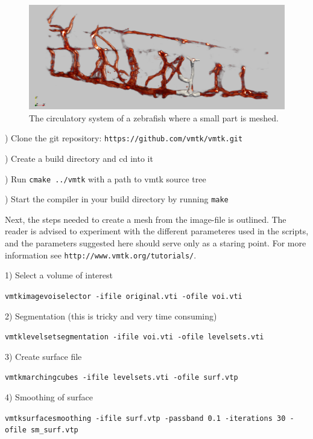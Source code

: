 \documentclass[epsfig,11pt]{article}
\begin{document}
 \begin{figure}[h!] 
\begin{center}
  \includegraphics[scale=0.3]{overview2.png}
  \end{center}
  \caption{The circulatory system of a zebrafish where a small part is meshed.}
\end{figure}

) Clone the git repository: {\color{Strings} \texttt{https://github.com/vmtk/vmtk.git}}

) Create a build directory and cd into it

) Run \texttt{cmake ../vmtk} with a path to vmtk source tree

) Start the compiler in your build directory by running \texttt{make}

Next, the steps needed to create a mesh from the image-file is outlined. The reader is advised to experiment with the different parameteres used in the scripts, and the parameters suggested here should serve only as a staring point. For more information see {\color{Strings}\texttt{http://www.vmtk.org/tutorials/}}.

\vspace{0.5cm}

1) Select a volume of interest
\begin{framed}       
    \texttt{vmtkimagevoiselector -ifile original.vti -ofile voi.vti}
\end{framed}
2) Segmentation (this is tricky and very time consuming)
\begin{framed}       
    \texttt{vmtklevelsetsegmentation -ifile voi.vti -ofile levelsets.vti}
\end{framed}
3) Create surface file
\begin{framed}       
    \texttt{vmtkmarchingcubes -ifile levelsets.vti -ofile surf.vtp}
\end{framed}
4) Smoothing of surface
\begin{framed}       
    \texttt{vmtksurfacesmoothing -ifile surf.vtp -passband 0.1 -iterations 30 -ofile sm\_surf.vtp}
\end{framed}
\end{document}
